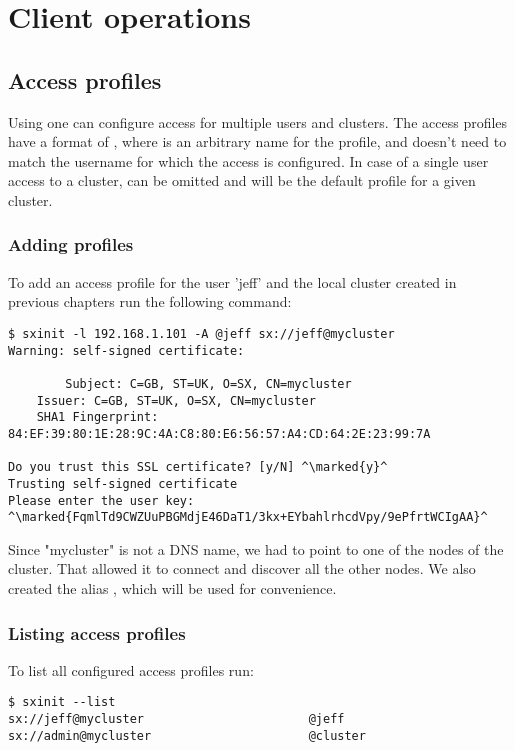 \chapter{Client operations}

\section{Access profiles}
\label{sec:profiles}
Using  one can configure access for multiple users
and clusters. The access profiles have a format of
, where 
is an arbitrary name for the profile, and doesn't need to match
the username for which the access is configured. In case of a single
user access to a cluster,  can be omitted and
 will be the default profile for a given
cluster.

\subsection{Adding profiles}
To add an access profile for the user 'jeff' and the local cluster
created in previous chapters run the following command:
\begin{lstlisting}
$ sxinit -l 192.168.1.101 -A @jeff sx://jeff@mycluster
Warning: self-signed certificate:

        Subject: C=GB, ST=UK, O=SX, CN=mycluster
	Issuer: C=GB, ST=UK, O=SX, CN=mycluster
	SHA1 Fingerprint: 84:EF:39:80:1E:28:9C:4A:C8:80:E6:56:57:A4:CD:64:2E:23:99:7A

Do you trust this SSL certificate? [y/N] ^\marked{y}^
Trusting self-signed certificate
Please enter the user key: ^\marked{FqmlTd9CWZUuPBGMdjE46DaT1/3kx+EYbahlrhcdVpy/9ePfrtWCIgAA}^
\end{lstlisting}
Since "mycluster" is not a DNS name, we had to point  
to one of the nodes of the cluster. That allowed it to connect and
discover all the other nodes. We also created the alias ,
which will be used for convenience.

\subsection{Listing access profiles}
To list all configured access profiles run:
\begin{lstlisting}
$ sxinit --list
sx://jeff@mycluster                       @jeff
sx://admin@mycluster                      @cluster
\end{lstlisting}

